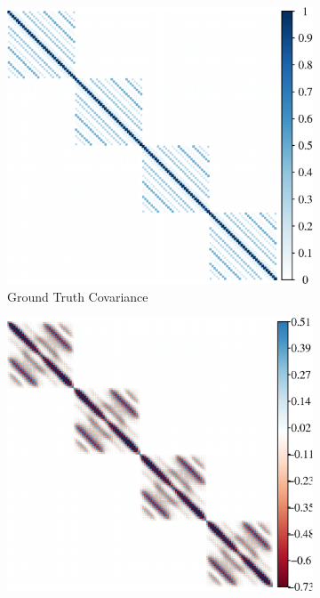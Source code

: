 \begin{figure}[!htb]
    \centering
    \begin{subfigure}[b]{0.3\textwidth}
      \includegraphics[width=\textwidth]{gaussian-process/latex/figures/periodic_gaussian_block_covariance.eps}
        \caption{Ground Truth Covariance}
    \end{subfigure}
    \hfill %
    \begin{subfigure}[b]{0.3\textwidth}
        \includegraphics[width=\textwidth]{gaussian-process/latex/figures/periodic_gaussian_block_precision.eps}

\end{subfigure}
\end{figure}
